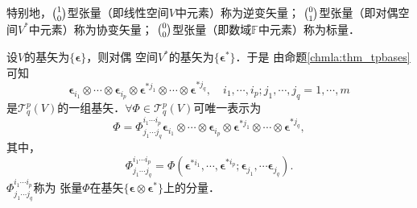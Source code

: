 特别地，$\binom{1}{0}$型张量（即线性空间$V$中元素）称为{\heiti 逆变矢量}；
$\binom{0}{1}$型张量（即对偶空间$V^*$中元素）称为{\heiti 协变矢量}；
$\binom{0}{0}$型张量（即数域$\mathbb{F}$中元素）称为{\heiti 标量}．


设$V$的基矢为$\{\boldsymbol{\epsilon}\}$，则对偶
空间$V^*$的基矢为$\{\boldsymbol{\epsilon}^{*}\}$．于是
由命题\ref{chmla:thm_tpbases}可知
\begin{equation}
    \boldsymbol{\epsilon}_{i_1} \otimes\cdots\otimes \boldsymbol{\epsilon}_{i_p} \otimes
    \boldsymbol{\epsilon}^{*j_1} \otimes\cdots\otimes \boldsymbol{\epsilon}^{*j_q}, \quad
    i_1, \cdots, i_p; j_1, \cdots, j_q = 1,\cdots, m
\end{equation}
是$\mathcal{T}^p_q(V)$的一组基矢．$\forall \Phi \in \mathcal{T}^p_q(V)$可唯一表示为
\begin{equation}\label{chmla:eqn_tmp201}
    \Phi = \Phi^{i_1 \cdots i_p} _{j_1 \cdots j_q}
    \boldsymbol{\epsilon}_{i_1} \otimes\cdots\otimes \boldsymbol{\epsilon}_{i_p} \otimes
    \boldsymbol{\epsilon}^{*j_1} \otimes\cdots\otimes \boldsymbol{\epsilon}^{*j_q},
\end{equation}
其中，
\begin{equation}\label{chmla:eqn_tmp203}
    \Phi^{i_1 \cdots i_p} _{j_1 \cdots j_q} =
    \Phi(\boldsymbol{\epsilon}^{*i_1}, \cdots, \boldsymbol{\epsilon}^{*i_p};
    \boldsymbol{\epsilon}_{j_1},\cdots \boldsymbol{\epsilon}_{j_q}) .
\end{equation}
$\Phi^{i_1 \cdots i_p} _{j_1 \cdots j_q}$称为
张量$\Phi$在基矢$\{\boldsymbol{\epsilon}\otimes\boldsymbol{\epsilon}^{*}\}$上的{\heiti 分量}．

